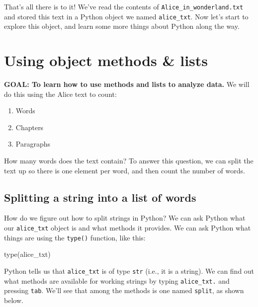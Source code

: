 \documentclass[
]{book}
\newenvironment{Shaded}{\begin{snugshade}}{\end{snugshade}}
\newcommand{\BuiltInTok}[1]{#1}
\newcommand{\NormalTok}[1]{#1}
\providecommand{\tightlist}{%
  \setlength{\itemsep}{0pt}\setlength{\parskip}{0pt}}
\begin{document}
That's all there is to it! We've read the contents of \texttt{Alice\_in\_wonderland.txt} and stored this text in a Python object we named \texttt{alice\_txt}. Now let's start to explore this object, and learn some more things about Python along the way.

\hypertarget{using-object-methods-lists}{%
\section{Using object methods \& lists}\label{using-object-methods-lists}}

\textbf{GOAL: To learn how to use methods and lists to analyze data.} We will do this using the Alice text to count:

\begin{enumerate}
\def\labelenumi{\arabic{enumi}.}
\tightlist
\item
  Words
\item
  Chapters
\item
  Paragraphs
\end{enumerate}

How many words does the text contain? To answer this question, we can split the text up so there is one element per word, and then count the number of words.

\hypertarget{splitting-a-string-into-a-list-of-words}{%
\subsection{Splitting a string into a list of words}\label{splitting-a-string-into-a-list-of-words}}

How do we figure out how to split strings in Python? We can ask Python what our \texttt{alice\_txt} object is and what methods it provides. We can ask Python what things are using the \texttt{type()} function, like this:

\begin{Shaded}
\begin{Highlighting}[]
\BuiltInTok{type}\NormalTok{(alice_txt)}
\end{Highlighting}
\end{Shaded}

Python tells us that \texttt{alice\_txt} is of type \texttt{str} (i.e., it is a string). We can find out what methods are available for working strings by typing \texttt{alice\_txt.} and pressing \texttt{tab}. We'll see that among the methods is one named \texttt{split}, as shown below.
\end{document}
